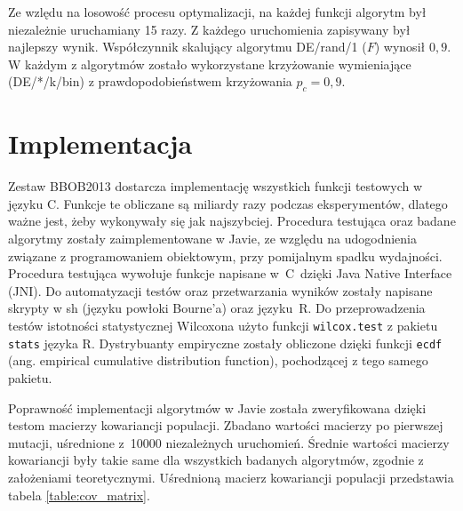 \documentclass[a4paper,onecolumn,oneside,11pt,wide,floatssmall]{mwrep}
\theoremstyle{definition}
\theoremstyle{plain}%
\theoremstyle{remark}
\begin{document}
Ze wzlędu na losowość procesu optymalizacji, na każdej funkcji algorytm był niezależnie uruchamiany 15 razy.
Z każdego uruchomienia zapisywany był 
najlepszy wynik. Współczynnik skalujący algorytmu DE/rand/1 ($F$) wynosił $0,9$. 
W każdym z algorytmów zostało wykorzystane krzyżowanie wymieniające (DE/*/k/bin) z
prawdopodobieństwem krzyżowania $p_c = 0,9$.

\section{Implementacja}

Zestaw BBOB2013 dostarcza implementację wszystkich funkcji testowych w języku C. Funkcje te obliczane
są miliardy razy podczas eksperymentów, dlatego ważne jest, żeby wykonywały się jak najszybciej.
Procedura testująca oraz badane algorytmy zostały zaimplementowane w 
Javie, ze względu na udogodnienia związane z programowaniem obiektowym, przy pomijalnym spadku 
wydajności. Procedura testująca wywołuje funkcje napisane w~C~dzięki Java Native Interface (JNI).
Do automatyzacji testów oraz przetwarzania wyników zostały napisane skrypty w sh 
(języku powłoki Bourne'a) oraz języku~R. Do przeprowadzenia testów istotności statystycznej Wilcoxona 
użyto funkcji \texttt{wilcox.test} z pakietu \texttt{stats} języka R. Dystrybuanty empiryczne
zostały obliczone dzięki funkcji \texttt{ecdf} (ang. empirical cumulative distribution function),
pochodzącej z tego samego pakietu.

Poprawność implementacji algorytmów w Javie została zweryfikowana dzięki testom macierzy kowariancji
populacji. Zbadano wartości macierzy po pierwszej mutacji, uśrednione z~10000 niezależnych uruchomień. 
Średnie wartości macierzy kowariancji były takie same dla wszystkich badanych algorytmów, zgodnie z 
założeniami teoretycznymi. Uśrednioną macierz kowariancji populacji przedstawia tabela 
\ref{table:cov_matrix}. 
\end{document}

